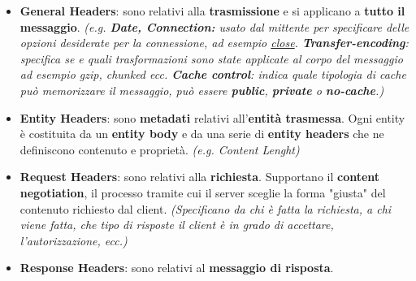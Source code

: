 \documentclass[11pt,a4paper,oneside]{book}
\theoremstyle{definition}
\begin{document}
\begin{itemize}
	\item \textbf{General Headers}: sono relativi alla \textbf{trasmissione} e si applicano a \textbf{tutto il messaggio}. \textit{(e.g. \textbf{Date, Connection:} usato dal mittente per specificare delle opzioni desiderate per la connessione, ad esempio \underline{close}. \textbf{Transfer-encoding}: specifica se e quali trasformazioni sono state applicate al corpo del messaggio ad esempio gzip, chunked ecc. \textbf{Cache control}: indica quale tipologia di cache può memorizzare il messaggio, può essere \textbf{public}, \textbf{private} o \textbf{no-cache}.)}
	\item \textbf{Entity Headers}: sono \textbf{metadati} relativi all'\textbf{entità trasmessa}. Ogni entity è costituita da un \textbf{entity body} e da una
	      serie di \textbf{entity headers} che ne definiscono contenuto e
	      proprietà. \textit{(e.g. Content Lenght)}
	\item \textbf{Request Headers}: sono relativi alla \textbf{richiesta}. Supportano il \textbf{content negotiation}, il processo tramite cui il server sceglie la forma "giusta" del contenuto richiesto dal client. \textit{(Specificano da chi è fatta la richiesta, a chi viene fatta, che tipo di risposte il client è in grado di accettare, l'autorizzazione, ecc.)}
	\item \textbf{Response Headers}: sono relativi al \textbf{messaggio di risposta}.
\end{itemize}

\pagebreak
\end{document}
